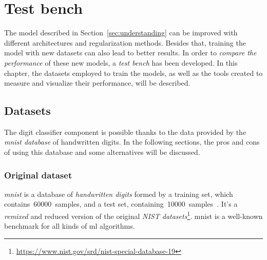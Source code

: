 \chapter{Test bench}\label{ch:benchmark}
The model described in Section~\ref{sec:understanding} can be improved with different architectures and regularization methods. Besides that, training the model with new datasets can also lead to better results. In order to \emph{compare the performance} of these new models, a \emph{test bench} has been developed. In this chapter, the datasets employed to train the models, as well as the tools created to measure and visualize their performance, will be described.

\section{Datasets}\label{sec:datasets}
The digit classifier component is possible thanks to the data provided by the \emph{\gls{mnist} database} of handwritten digits. In the following sections, the pros and cons of using this database and some alternatives will be discussed.

\subsection{Original dataset}\label{subsec:MNIST}
\emph{\gls{mnist}} is a database of \emph{handwritten digits} formed by a training set, which contains~60000~samples, and a test set, containing~10000~samples~\cite{lecun-mnisthandwrittendigit-2010}. It's a \textit{remixed} and reduced version of the original \emph{NIST datasets}\footnote{\url{https://www.nist.gov/srd/nist-special-database-19}}. \gls{mnist} is a well-known benchmark for all kinds of \gls{ml} algorithms.

